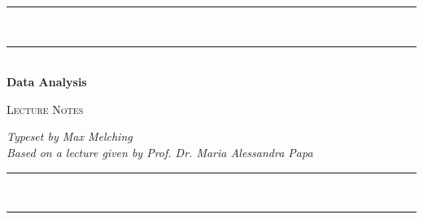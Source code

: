 


\usetikzlibrary{patterns}
\usetikzlibrary{trees}




\pagestyle{plain.scrheadings}


\begin{center}
\thispagestyle{empty}


\rule{0pt}{0pt}

\vspace{4\baselineskip}%


\settowidth{\unitlength}{\LARGE\bfseries Data Analysis}%

\rule{2\unitlength}{0.4pt}\vspace*{-\baselineskip}\vspace{3.2pt}\\
\rule{2\unitlength}{1.6pt}\vspace{\baselineskip}\\

{\LARGE\bfseries Data Analysis}


\vspace{\baselineskip}%

{\Large\scshape Lecture Notes}%


\vspace{2\baselineskip}%

{\large\slshape Typeset by Max Melching\\Based on a lecture given by Prof. Dr. Maria Alessandra Papa}


\rule{2\unitlength}{1.6pt}\vspace*{-\baselineskip}\vspace{3.2pt}\\
\rule{2\unitlength}{0.4pt}
\end{center}

\setcounter{page}{0}
\thispagestyle{empty}



\newpage



\iffalse
\begin{titlepage}
\centering

\title{Data Analysis}

\subtitle{Summary}


\author{Typeset by Max Melching\\Based on a lecture given by Maria Alessandra Papa}
\date{}%
\maketitle
\end{titlepage}
\fi



